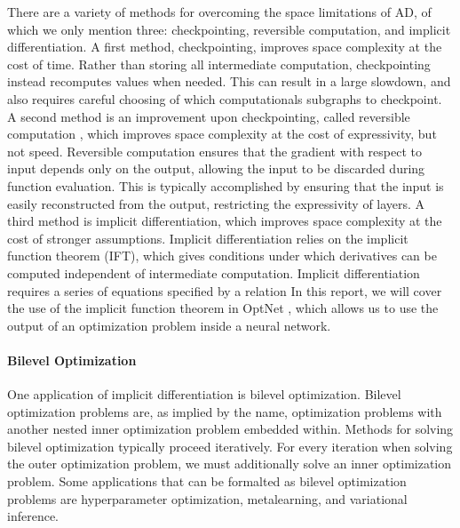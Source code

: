 \documentclass[11pt]{article}
\begin{document}
There are a variety of methods for overcoming the space limitations of AD,
of which we only mention three: checkpointing, reversible computation, and implicit differentiation.
A first method, checkpointing, improves space complexity at the cost of time.
Rather than storing all intermediate computation,
checkpointing instead recomputes values when needed.
This can result in a large slowdown,
and also requires careful choosing of which computationals subgraphs to checkpoint.
A second method is an improvement upon checkpointing, called reversible computation \citep{maclaurin2015reversible,gomez2017reversible},
which improves space complexity at the cost of expressivity, but not speed.
Reversible computation ensures that the gradient with respect to input depends only on the output,
allowing the input to be discarded during function evaluation.
This is typically accomplished by ensuring that the input is easily reconstructed from the output,
restricting the expressivity of layers.
A third method is implicit differentiation,
which improves space complexity at the cost of stronger assumptions.
Implicit differentiation relies on the implicit function theorem (IFT),
which gives conditions under which derivatives can be computed independent of
intermediate computation.
Implicit differentiation requires a series of equations specified by a relation
In this report, we will cover the use of the implicit function theorem
in OptNet \citep{}, which allows us to use the output of an
optimization problem inside a neural network.

\paragraph{Bilevel Optimization}
One application of implicit differentiation is bilevel optimization.
Bilevel optimization problems are, as implied by the name,
optimization problems with another nested inner optimization problem embedded within.
Methods for solving bilevel optimization typically proceed iteratively.
For every iteration when solving the outer optimization problem,
we must additionally solve an inner optimization problem.
Some applications that can be formalted as bilevel optimization problems are
hyperparameter optimization, metalearning, and variational inference.
\end{document}
